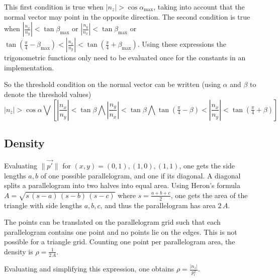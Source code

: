 This first condition is true when $|n_z| > \cos \alpha_\text{max}$, taking into account that the normal vector may point in the opposite direction. The second condition is true when $|\frac{n_x}{n_y}| < \tan \beta_{\text{max}}$ or $|\frac{n_y}{n_x}| < \tan \beta_{\text{max}}$ or $\tan \left(\frac{\pi}{4} - \beta_{\text{max}}\right) < |\frac{n_x}{n_y}| < \tan \left(\frac{\pi}{4} + \beta_{\text{max}}\right)$. Using these expressions the trigonometric functions only need to be evaluated once for the constants in an implementation.

So the threshold condition on the normal vector can be written (using $\alpha$ and $\beta$ to denote the threshold values)
\begin{equation}
|n_z| > \cos \alpha \bigvee
\left[
\left|\frac{n_x}{n_y}\right| < \tan \beta
\bigwedge \left|\frac{n_y}{n_x}\right| < \tan \beta
\bigwedge \tan \left(\tfrac{\pi}{4} - \beta\right) < \left|\frac{n_x}{n_y}\right| < \tan \left(\tfrac{\pi}{4} + \beta \right)
\right]
\end{equation}


\subsection{Density}
Evaluating $\| \vec{p'} \|$ for $(x, y) = (0, 1), (1, 0), (1, 1)$, one gets the side lengths $a, b$ of one possible parallelogram, and one if its diagonal. A diagonal splits a parallelogram into two halves into equal area. Using Heron's formula $A = \sqrt{s \, (s - a) \, (s - b) \, (s - c)}$ where $s = \frac{a+b+c}{2}$, one gets the area of the triangle with side lengths $a, b, c$, and thus the parallelogram has area $2 \, A$.

The points can be translated on the parallelogram grid such that each parallelogram contains one point and no points lie on the edges. This is not possible for a triangle grid. Counting one point per parallelogram area, the density is $\rho = \frac{1}{2 \, A}$.

Evaluating and simplifying this expression, one obtains $\rho = \frac{| n_z |}{p^2_l}$.


